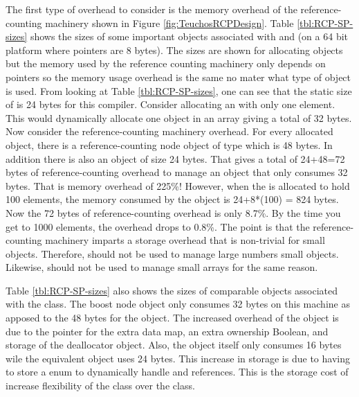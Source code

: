 \documentclass[pdf,ps2pdf,11pt]{SANDreport}
\begin{document}
The first type of overhead to consider is the memory overhead of the
reference-counting machinery shown in Figure
{}\ref{fig:TeuchosRCPDesign}.  Table {}\ref{tbl:RCP-SP-sizes} shows
the sizes of some important objects associated with {} and
{} (on a 64 bit platform where pointers are
8 bytes).  The sizes are shown for allocating
{} objects but the memory used by the
reference counting machinery only depends on pointers so the memory
usage overhead is the same no mater what type of object is used.  From
looking at Table {}\ref{tbl:RCP-SP-sizes}, one can see that the static
size of {} is 24 bytes for this compiler.
Consider allocating an {} with only one
element.  This would dynamically allocate one {} object
in an array giving a total of 32 bytes.  Now consider the
reference-counting machinery overhead.  For every allocated
{} object, there is a reference-counting
node object of type {}
which is 48 bytes.  In addition there is also an
{} object of size 24 bytes.  That
gives a total of 24+48=72 bytes of reference-counting overhead to
manage an object that only consumes 32 bytes.  That is memory overhead
of 225\%!  However, when the {} is
allocated to hold 100 elements, the memory consumed by the
{} object is 24+8*(100) = 824 bytes.  Now
the 72 bytes of reference-counting overhead is only 8.7\%.  By the
time you get to 1000 elements, the overhead drops to 0.8\%.  The point
is that the reference-counting machinery imparts a storage overhead
that is non-trivial for small objects.  Therefore, {}
should not be used to manage large numbers small objects.  Likewise,
{} should not be used to manage small arrays for the
same reason.

Table {}\ref{tbl:RCP-SP-sizes} also shows the sizes of comparable
objects associated with the {} class.  The
boost node object only consumes 32 bytes on this machine as apposed to
the 48 bytes for the {} object.  The increased
overhead of the {} object is due to the pointer
for the extra data map, an extra ownership Boolean, and storage of the
deallocator object.  Also, the {} object
itself only consumes 16 bytes wile the equivalent {}
object uses 24 bytes.  This increase in storage is due to having to
store a {} enum to dynamically handle
{} and {} references.  This is the storage
cost of increase flexibility of the {} class over the
{} class.
\end{document}
